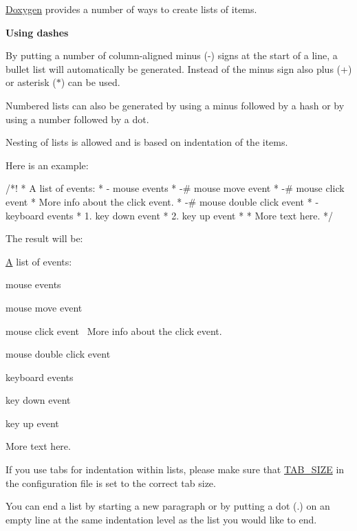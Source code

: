 \mbox{\hyperlink{class_doxygen}{Doxygen}} provides a number of ways to create lists of items.

{\bfseries{Using dashes}}

By putting a number of column-\/aligned minus (-\/) signs at the start of a line, a bullet list will automatically be generated. Instead of the minus sign also plus (+) or asterisk ($\ast$) can be used.

Numbered lists can also be generated by using a minus followed by a hash or by using a number followed by a dot.

Nesting of lists is allowed and is based on indentation of the items.

Here is an example\+:

\begin{DoxyVerb}  /*! 
   *  A list of events:
   *    - mouse events
   *         -# mouse move event
   *         -# mouse click event\n
   *            More info about the click event.
   *         -# mouse double click event
   *    - keyboard events
   *         1. key down event
   *         2. key up event
   *
   *  More text here.
   */
\end{DoxyVerb}
 The result will be\+:

\mbox{\hyperlink{class_a}{A}} list of events\+:
\begin{DoxyItemize}
\item mouse events
\begin{DoxyEnumerate}
\item mouse move event
\item mouse click event~\newline
 More info about the click event.
\item mouse double click event
\end{DoxyEnumerate}
\item keyboard events
\begin{DoxyEnumerate}
\item key down event
\item key up event
\end{DoxyEnumerate}
\end{DoxyItemize}

More text here.

If you use tabs for indentation within lists, please make sure that \mbox{\hyperlink{config_cfg_tab_size}{T\+A\+B\+\_\+\+S\+I\+ZE}} in the configuration file is set to the correct tab size.

You can end a list by starting a new paragraph or by putting a dot (.) on an empty line at the same indentation level as the list you would like to end.

